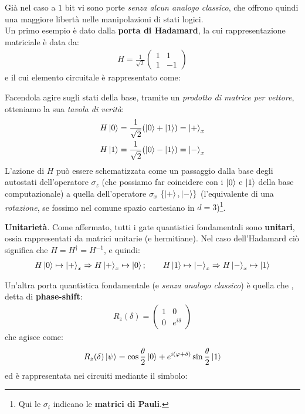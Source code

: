 \documentclass[../../InformazioneQuantistica.tex]{subfiles}
\begin{document}
Già nel caso a $1$ bit vi sono porte \textit{senza alcun analogo classico}, che offrono quindi una maggiore libertà nelle manipolazioni di stati logici.\\
Un primo esempio è dato dalla \textbf{porta di Hadamard}, la cui rappresentazione matriciale è data da:
\begin{align*}
H = \frac{1}{\sqrt{2}} \begin{pmatrix}
1 & 1\\1 & -1
\end{pmatrix}
\end{align*}
e il cui elemento circuitale è rappresentato come:



Facendola agire sugli stati della base, tramite un \textit{prodotto di matrice per vettore}, otteniamo la sua \textit{tavola di verità}:
\begin{align*}
H \Ket{0} &= \frac{1}{\sqrt{2}} (\Ket{0} + \Ket{1}) = \Ket{+}_x\\
H \Ket{1} &= \frac{1}{\sqrt{2}} (\Ket{0} - \Ket{1}) = \Ket{-}_x
\end{align*} 
L'azione di $H$ può essere schematizzata come un passaggio dalla base degli autostati dell'operatore $\sigma_z$ (che possiamo far coincidere con i $\Ket{0}$ e $\Ket{1}$ della base computazionale) a quella dell'operatore $\sigma_x$ $\{\Ket{+},\Ket{-}\}$ (l'equivalente di una \textit{rotazione}, se fossimo nel comune spazio cartesiano in $d=3$)\footnote{Qui le $\sigma_i$ indicano le \textbf{matrici di Pauli}.}.\\

\begin{expl}
\textbf{Unitarietà}. Come affermato, tutti i gate quantistici fondamentali sono \textbf{unitari}, ossia rappresentati da matrici unitarie (e hermitiane). Nel caso dell'Hadamard ciò significa che $H = H^\dag = H^{-1}$, e quindi:
\begin{align*}
    H\Ket{0} \mapsto \Ket{+}_x \Rightarrow H\Ket{+}_x \mapsto \Ket{0}; \qquad H\Ket{1}\mapsto \Ket{-}_x \Rightarrow H\Ket{-}_x \mapsto \Ket{1}
\end{align*}
\end{expl}

Un'altra porta quantistica fondamentale (e \textit{senza analogo classico}) è quella che , detta di \textbf{phase-shift}:
\begin{align*}
R_z(\delta) = \begin{pmatrix}
1 & 0\\0 & e^{i\delta}
\end{pmatrix}
\end{align*}
che agisce come:
\begin{align*}
R_z(\delta) \Ket{\psi} = \cos\frac{\theta}{2} \Ket{0} + e^{i(\varphi + \delta)} \sin\frac{\theta}{2} \Ket{1}
\end{align*}
ed è rappresentata nei circuiti mediante il simbolo:
\end{document}
